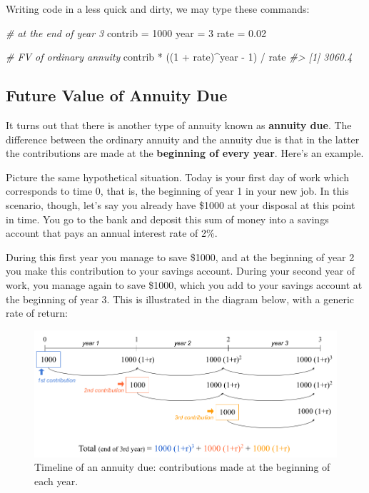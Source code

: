 \documentclass[
]{book}
\newenvironment{Shaded}{\begin{snugshade}}{\end{snugshade}}
\newcommand{\CommentTok}[1]{\textcolor[rgb]{0.56,0.35,0.01}{\textit{#1}}}
\newcommand{\DecValTok}[1]{\textcolor[rgb]{0.00,0.00,0.81}{#1}}
\newcommand{\FloatTok}[1]{\textcolor[rgb]{0.00,0.00,0.81}{#1}}
\newcommand{\NormalTok}[1]{#1}
\newcommand{\OtherTok}[1]{\textcolor[rgb]{0.56,0.35,0.01}{#1}}
\newcommand{\SpecialCharTok}[1]{\textcolor[rgb]{0.00,0.00,0.00}{#1}}
\begin{document}
Writing code in a less quick and dirty, we may type these commands:

\begin{Shaded}
\begin{Highlighting}[]
\CommentTok{\# at the end of year 3}
\NormalTok{contrib }\OtherTok{=} \DecValTok{1000}
\NormalTok{year }\OtherTok{=} \DecValTok{3}
\NormalTok{rate }\OtherTok{=} \FloatTok{0.02}

\CommentTok{\# FV of ordinary annuity}
\NormalTok{contrib }\SpecialCharTok{*}\NormalTok{ ((}\DecValTok{1} \SpecialCharTok{+}\NormalTok{ rate)}\SpecialCharTok{\^{}}\NormalTok{year }\SpecialCharTok{{-}} \DecValTok{1}\NormalTok{) }\SpecialCharTok{/}\NormalTok{ rate}
\CommentTok{\#\textgreater{} [1] 3060.4}
\end{Highlighting}
\end{Shaded}

\hypertarget{future-value-of-annuity-due}{%
\subsection{Future Value of Annuity Due}\label{future-value-of-annuity-due}}

It turns out that there is another type of annuity known as \textbf{annuity due}.
The difference between the ordinary annuity and the annuity due is that in the
latter the contributions are made at the \textbf{beginning of every year}. Here's an
example.

Picture the same hypothetical situation. Today is your first day of work
which corresponds to time 0, that is, the beginning of year 1 in your new job.
In this scenario, though, let's say you already have \$1000 at your disposal
at this point in time. You go to the bank and deposit this sum of money into a
savings account that pays an annual interest rate of 2\%.

During this first year you manage to save \$1000, and at the beginning of year 2
you make this contribution to your savings account. During your second year of
work, you manage again to save \$1000, which you add to your savings account at
the beginning of year 3. This is illustrated in the diagram below, with a
generic rate of return:

\begin{figure}

{\centering \includegraphics[width=0.95\linewidth]{images/conditionals/timeline-due-annuity} 

}

\caption{Timeline of an annuity due: contributions made at the beginning of each year.}\label{fig:unnamed-chunk-207}
\end{figure}
\end{document}
